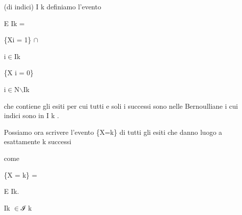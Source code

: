 \documentclass[a4paper,portrait,12pt]{article}
\begin{document}
\begin{flushleft}
(di indici) I k definiamo l'evento
\end{flushleft}


\begin{flushleft}
E Ik =
\end{flushleft}





\begin{flushleft}
\{Xi = 1\} $\cap$
\end{flushleft}


\begin{flushleft}
i$\in$Ik
\end{flushleft}





\begin{flushleft}
\{X i = 0\}
\end{flushleft}


\begin{flushleft}
i$\in$N\ensuremath{\backslash}Ik
\end{flushleft}





\begin{flushleft}
che contiene gli esiti per cui tutti e soli i successi sono nelle Bernoulliane i cui indici sono in I k .
\end{flushleft}


\begin{flushleft}
Possiamo ora scrivere l'evento \{X=k\} di tutti gli esiti che danno luogo a esattamente k successi
\end{flushleft}


\begin{flushleft}
come
\end{flushleft}


\begin{flushleft}
\{X = k\} =
\end{flushleft}





\begin{flushleft}
E Ik.
\end{flushleft}


\begin{flushleft}
Ik $\in$ℐ k
\end{flushleft}
\end{document}
